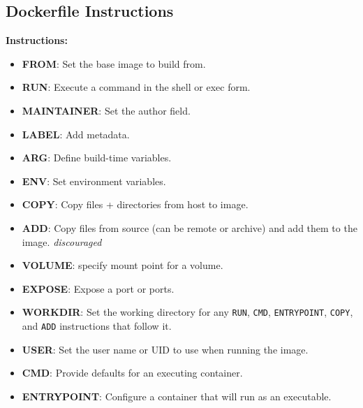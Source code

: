 \documentclass[a4paper,landscape]{article}
\begin{document}
\begin{multicols}{3}
\section*{Dockerfile Instructions}
\textbf{Instructions:}
\begin{itemize}
    \item \textbf{FROM}: Set the base image to build from.
    \item \textbf{RUN}: Execute a command in the shell or exec form.
    \item \textbf{MAINTAINER}: Set the author field.
    \item \textbf{LABEL}: Add metadata.
    \item \textbf{ARG}: Define build-time variables.
    \item \textbf{ENV}: Set environment variables.
    \item \textbf{COPY}: Copy files + directories from host to image.
    \item \textbf{ADD}: Copy files from source (can be remote or archive) and add them to the image. \textit{discouraged}
    \item \textbf{VOLUME}: specify mount point for a volume.
    \item \textbf{EXPOSE}: Expose a port or ports.
    \item \textbf{WORKDIR}: Set the working directory for any \texttt{RUN}, \texttt{CMD}, \texttt{ENTRYPOINT}, \texttt{COPY}, and \texttt{ADD} instructions that follow it.
    \item \textbf{USER}: Set the user name or UID to use when running the image.
    \item \textbf{CMD}: Provide defaults for an executing container.
    \item \textbf{ENTRYPOINT}: Configure a container that will run as an executable.
\end{itemize}

\end{multicols}
\end{document}
